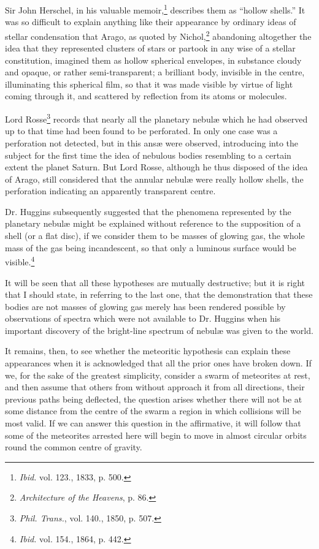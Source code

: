 \documentclass[a4paper, 12pt, oneside, polutonikogreek, english]{article}
\begin{document}
Sir John Herschel, in his valuable memoir,\footnote{\emph{Ibid.} vol. 123., 1833, p. 500.} describes them as ``hollow shells.'' It was so difficult to explain anything like their appearance by ordinary ideas of stellar condensation that Arago, as quoted by Nichol,\footnote{\emph{Architecture of the Heavens}, p. 86.} abandoning altogether the idea that they represented clusters of stars or partook in any wise of a stellar constitution, imagined them as hollow spherical envelopes, in substance cloudy and opaque, or rather semi-transparent; a brilliant body, invisible in the centre, illuminating this spherical film, so that it was made visible by virtue of light coming through it, and scattered by reflection from its atoms or molecules.

Lord Rosse\footnote{\emph{Phil. Trans.}, vol. 140., 1850, p. 507.} records that nearly all the planetary nebulæ which he had observed up to that time had been found to be perforated. In only one case was a perforation not detected, but in this ansæ were observed, introducing into the subject for the first time the idea of nebulous bodies resembling to a certain extent the planet Saturn. But Lord Rosse, although he thus disposed of the idea of Arago, still considered that the annular nebulæ were really hollow shells, the perforation indicating an apparently transparent centre.

Dr. Huggins subsequently suggested that the phenomena represented by the planetary nebulæ might be explained without reference to the supposition of a shell (or a flat disc), if we consider them to be masses of glowing gas, the whole mass of the gas being incandescent, so that only a luminous surface would be visible.\footnote{\emph{Ibid.} vol. 154., 1864, p. 442.}

It will be seen that all these hypotheses are mutually destructive; but it is right that I should state, in referring to the last one, that the demonstration that these bodies are not masses of glowing gas merely has been rendered possible by observations of spectra which were not available to Dr. Huggins when his important discovery of the bright-line spectrum of nebulæ was given to the world.

It remains, then, to see whether the meteoritic hypothesis can explain these appearances when it is acknowledged that all the prior ones have broken down. If we, for the sake of the greatest simplicity, consider a swarm of meteorites at rest, and then assume that others from without approach it from all directions, their previous paths being deflected, the question arises whether there will not be at some distance from the centre of the swarm a region in which collisions will be most valid. If we can answer this question in the affirmative, it will follow that some of the meteorites arrested here will begin to move in almost circular orbits round the common centre of gravity.
\end{document}
